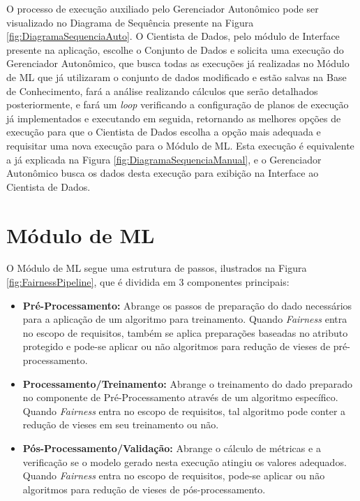 \documentclass[portugues]{ic-tese}
\begin{document}
O processo de execução auxiliado pelo Gerenciador Autonômico pode ser visualizado no Diagrama de Sequência presente na Figura \ref{fig:DiagramaSequenciaAuto}. O Cientista de Dados, pelo módulo de Interface presente na aplicação, escolhe o Conjunto de Dados e solicita uma execução do Gerenciador Autonômico, que busca todas as execuções já realizadas no Módulo de ML que já utilizaram o conjunto de dados modificado e estão salvas na Base de Conhecimento, fará a análise realizando cálculos que serão detalhados posteriormente, e fará um \textit{loop} verificando a configuração de planos de execução já implementados e executando em seguida, retornando as melhores opções de execução para que o Cientista de Dados escolha a opção mais adequada e requisitar uma nova execução para o Módulo de ML. Esta execução é equivalente a já explicada na Figura \ref{fig:DiagramaSequenciaManual}, e o Gerenciador Autonômico busca os dados desta execução para exibição na Interface ao Cientista de Dados.

\section{Módulo de ML}
\label{sec:ModuloML}

O Módulo de ML segue uma estrutura de passos, ilustrados na Figura \ref{fig:FairnessPipeline}, que é dividida em 3 componentes principais:

\begin{itemize}
	\item \textbf{Pré-Processamento:} Abrange os passos de preparação do dado necessários para a aplicação de um algoritmo para treinamento. Quando \textit{Fairness} entra no escopo de requisitos, também se aplica preparações baseadas no atributo protegido e pode-se aplicar ou não algoritmos para redução de vieses de pré-processamento.
	\item \textbf{Processamento/Treinamento:} Abrange o treinamento do dado preparado no componente de Pré-Processamento através de um algoritmo específico. Quando \textit{Fairness} entra no escopo de requisitos, tal algoritmo pode conter a redução de vieses em seu treinamento ou não.
	\item \textbf{Pós-Processamento/Validação:} Abrange o cálculo de métricas e a verificação se o modelo gerado nesta execução atingiu os valores adequados. Quando \textit{Fairness} entra no escopo de requisitos, pode-se aplicar ou não algoritmos para redução de vieses de pós-processamento.
\end{itemize}
\end{document}
